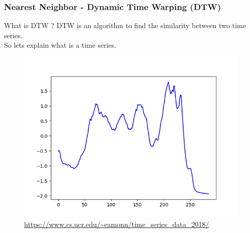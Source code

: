 \documentclass{beamer}
\begin{document}
\begin{frame}
\frametitle{Nearest Neighbor - Dynamic Time Warping (DTW)}
\begin{block}{What is DTW ?}
DTW is an algorithm to find the similarity between two time series.\\
So lets explain what is a time series.
\end{block}
\begin{figure}
\centering
\includegraphics[scale=0.4]{Coffee.png}
\caption{\url{https://www.cs.ucr.edu/~eamonn/time_series_data_2018/}}
\end{figure}

\end{frame}
\end{document}
